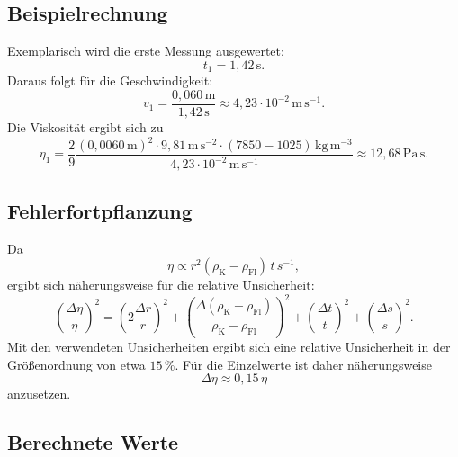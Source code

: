 \documentclass{report}
\begin{document}
\subsection{Beispielrechnung}

Exemplarisch wird die erste Messung ausgewertet:
\begin{equation}
    t_1 = 1{,}42\,\mathrm{s}.
\end{equation}
Daraus folgt für die Geschwindigkeit:
\begin{equation}
    v_1 = \frac{0{,}060\,\mathrm{m}}{1{,}42\,\mathrm{s}}
        \approx 4{,}23 \cdot 10^{-2}\,\mathrm{m\,s^{-1}}.
\end{equation}
\noindent
Die Viskosität ergibt sich zu
\begin{equation}
    \eta_1
    = \frac{2}{9}
      \frac{(0{,}0060\,\mathrm{m})^2 \cdot 9{,}81\,\mathrm{m\,s^{-2}}
      \cdot (7850 - 1025)\,\mathrm{kg\,m^{-3}}}
      {4{,}23 \cdot 10^{-2}\,\mathrm{m\,s^{-1}}}
    \approx 12{,}68\,\mathrm{Pa\,s}.
\end{equation}

\subsection{Fehlerfortpflanzung}

Da
\begin{equation}
    \eta \propto r^2 (\rho_{\mathrm{K}} - \rho_{\mathrm{Fl}})\, t\, s^{-1},
\end{equation}
ergibt sich näherungsweise für die relative Unsicherheit:
\begin{equation}
    \left(\frac{\Delta \eta}{\eta}\right)^2
    =
    \left(2\frac{\Delta r}{r}\right)^2
    +
    \left(\frac{\Delta(\rho_{\mathrm{K}}-\rho_{\mathrm{Fl}})}{\rho_{\mathrm{K}}-\rho_{\mathrm{Fl}}}\right)^2
    +
    \left(\frac{\Delta t}{t}\right)^2
    +
    \left(\frac{\Delta s}{s}\right)^2.
\end{equation}
\noindent
Mit den verwendeten Unsicherheiten ergibt sich eine relative Unsicherheit in der
Größenordnung von etwa $15\,\%$. Für die Einzelwerte ist daher näherungsweise
\begin{equation}
    \Delta \eta \approx 0{,}15 \,\eta
\end{equation}
anzusetzen.

\subsection{Berechnete Werte}
\end{document}
